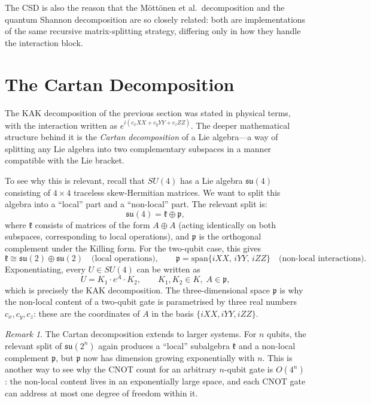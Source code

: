 \documentclass[12pt, a4paper, oneside]{report}
\theoremstyle{plain}
\theoremstyle{definition}
\theoremstyle{remark}
\newtheorem{remark}[theorem]{Remark}
\begin{document}
The CSD is also the reason that the Möttönen et al.\ decomposition and the quantum Shannon
decomposition are so closely related: both are implementations of the same recursive
matrix-splitting strategy, differing only in how they handle the interaction block.


\section{The Cartan Decomposition}

The KAK decomposition of the previous section was stated in physical terms, with the
interaction written as $e^{i(c_x XX + c_y YY + c_z ZZ)}$. The deeper mathematical
structure behind it is the \emph{Cartan decomposition} of a Lie algebra---a way of splitting
any Lie algebra into two complementary subspaces in a manner compatible with the Lie bracket.

To see why this is relevant, recall that $SU(4)$ has a Lie algebra $\mathfrak{su}(4)$
consisting of $4 \times 4$ traceless skew-Hermitian matrices. We want to split this algebra
into a ``local'' part and a ``non-local'' part. The relevant split is:
\[
	\mathfrak{su}(4) = \mathfrak{k} \oplus \mathfrak{p},
\]
where $\mathfrak{k}$ consists of matrices of the form $A \oplus A$ (acting identically on
both subspaces, corresponding to local operations), and $\mathfrak{p}$ is the orthogonal
complement under the Killing form. For the two-qubit case, this gives
\[
	\mathfrak{k} \cong \mathfrak{su}(2) \oplus \mathfrak{su}(2)
	\quad\text{(local operations)},
	\qquad
	\mathfrak{p} = \mathrm{span}\{iXX,\,iYY,\,iZZ\}
	\quad\text{(non-local interactions)}.
\]
Exponentiating, every $U \in SU(4)$ can be written as
\[
	U = K_1 \cdot e^{A} \cdot K_2, \qquad K_1, K_2 \in K,\; A \in \mathfrak{p},
\]
which is precisely the KAK decomposition. The three-dimensional space $\mathfrak{p}$ is
why the non-local content of a two-qubit gate is parametrised by three real numbers $c_x,
	c_y, c_z$: these are the coordinates of $A$ in the basis $\{iXX, iYY, iZZ\}$.

\begin{remark}
	The Cartan decomposition extends to larger systems. For $n$ qubits, the relevant split of
	$\mathfrak{su}(2^n)$ again produces a ``local'' subalgebra $\mathfrak{k}$ and a non-local
	complement $\mathfrak{p}$, but $\mathfrak{p}$ now has dimension growing exponentially with
	$n$. This is another way to see why the CNOT count for an arbitrary $n$-qubit gate is
	$O(4^n)$: the non-local content lives in an exponentially large space, and each CNOT gate
	can address at most one degree of freedom within it.
\end{remark}
\end{document}

